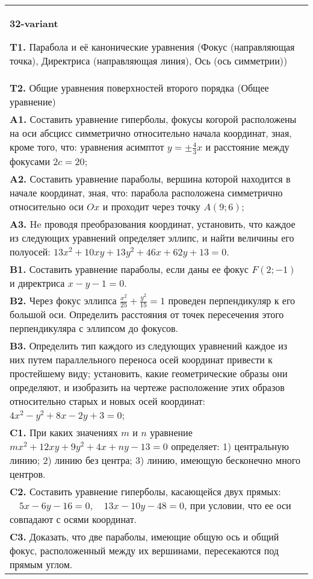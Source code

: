 \documentclass{article}
\begin{document}
\begin{tabular}{m{17cm}}
\textbf{32-variant}
\newline

\textbf{T1.} Парабола и её канонические уравнения (Фокус (направляющая точка), Директриса (направляющая линия), Ось (ось симметрии)) \\
\textbf{T2.} Общие уравнения поверхностей второго порядка (Общее уравнение) \\
\textbf{A1.} Составить уравнение гиперболы, фокусы когорой расположены на оси абсцисс симметрично относительно начала координат, зная, кроме того, что: уравнения асимптот $y= \pm \frac{4}{3} x$ и расстояние между фокусами $2 c=20$; \\
\textbf{A2.} Составить уравнение параболы, вершина которой находится в начале координат, зная, что: парабола расположена симметрично относительно оси $O x$ и проходит через точку $A(9 ; 6)$; \\
\textbf{A3.} He проводя преобразования координат, установить, что каждое из следующих уравнений определяет эллипс, и найти величины его полуосей: $13 x^2+10 x y+13 y^2+46 x+62 y+13=0$. \\
\textbf{B1.} Составить уравнение параболы, если даны ее фокус $F(2 ;-1)$ и директриса $x-y-1=0$. \\
\textbf{B2.} Через фокус эллипса $\frac{x^2}{25}+\frac{y^2}{15}=1$ проведен перпендикуляр к его большой оси. Определить расстояния от точек пересечения этого перпендикуляра с эллипсом до фокусов. \\
\textbf{B3.} Определить тип каждого из следующих уравнений каждое из них путем параллельного переноса осей координат привести к простейшему виду; установить, какие геометрические образы они определяют, и изобразить на чертеже расположение этих образов относительно старых и новых осей координат: $4 x^2-y^2+8 x-2 y+3=0$; \\
\textbf{C1.} При каких значениях $m$ и $n$ уравнение $m x^2+12 x y+9 y^2+4 x+n y-13=0$ определяет: 1) центральную линию; 2) линию без центра; 3) линию, имеющую бесконечно много центров. \\
\textbf{C2.} Составить уравнение гиперболы, касающейся двух прямых: $\quad 5 x-6 y-16=0, \quad 13 x-10 y-48=0$, при условии, что ее оси совпадают с осями координат. \\
\textbf{C3.} Доказать, что две параболы, имеющие общую ось и общий фокус, расположенный между их вершинами, пересекаются под прямым углом. \\

\end{tabular}
\vspace{1cm}
\end{document}
